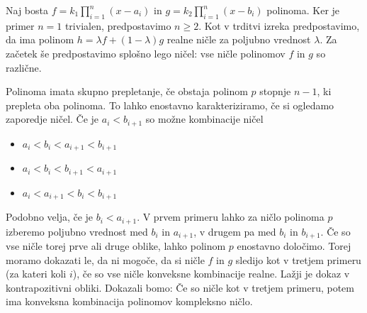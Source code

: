 \begin{dokaz}
    Naj bosta \(f =  k_1 \prod_{i=1}^n (x-a_i)\) in \(g =  k_2 \prod_{i=1}^n (x-b_i)\) polinoma. Ker je primer \(n=1\) trivialen, predpostavimo \(n\geq2\). Kot v trditvi izreka predpostavimo, da ima polinom \(h = \lambda f + (1-\lambda) g\) realne ničle za poljubno vrednost \(\lambda\). Za začetek še predpostavimo splošno lego ničel: vse ničle polinomov \(f\) in \(g\) so različne.

    Polinoma imata skupno prepletanje, če obstaja polinom \(p\) stopnje \(n-1\), ki prepleta oba polinoma. To lahko enostavno karakteriziramo, če si ogledamo zaporedje ničel. Če je \(a_i < b_{i+1}\) so možne kombinacije ničel
    \begin{itemize}
        \item \(a_i < b_i < a_{i+1} < b_{i+1}\)
        \item \(a_i < b_i < b_{i+1} < a_{i+1}\)
        \item \(a_i < a_{i+1} < b_i < b_{i+1}\)
    \end{itemize}
    Podobno velja, če je \(b_i < a_{i+1}\). V prvem primeru lahko za ničlo polinoma \(p\) izberemo poljubno vrednost med \(b_{i}\) in \(a_{i+1}\), v drugem pa med \(b_i\) in \(b_{i+1}\). Če so vse ničle torej prve ali druge oblike, lahko polinom \(p\) enostavno določimo. Torej moramo dokazati le, da ni mogoče, da si ničle \(f\) in \(g\) sledijo kot v tretjem primeru (za kateri koli \(i\)), če so vse ničle konveksne kombinacije realne. Lažji je dokaz v kontrapozitivni obliki. Dokazali bomo: Če so ničle kot v tretjem primeru, potem ima konveksna kombinacija polinomov kompleksno ničlo.


\end{dokaz}
